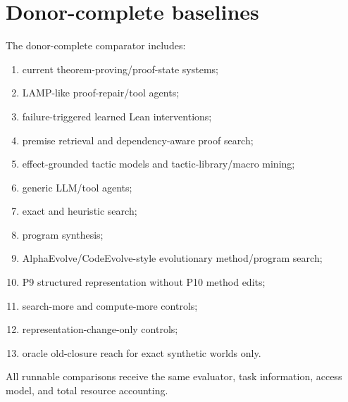 \section{Donor-complete baselines}
The donor-complete comparator includes:
\begin{enumerate}
    \item current theorem-proving/proof-state systems;
    \item LAMP-like proof-repair/tool agents;
    \item failure-triggered learned Lean interventions;
    \item premise retrieval and dependency-aware proof search;
    \item effect-grounded tactic models and tactic-library/macro mining;
    \item generic LLM/tool agents;
    \item exact and heuristic search;
    \item program synthesis;
    \item AlphaEvolve/CodeEvolve-style evolutionary method/program search;
    \item P9 structured representation without P10 method edits;
    \item search-more and compute-more controls;
    \item representation-change-only controls;
    \item oracle old-closure reach for exact synthetic worlds only.
\end{enumerate}
All runnable comparisons receive the same evaluator, task information, access model, and total resource accounting.

